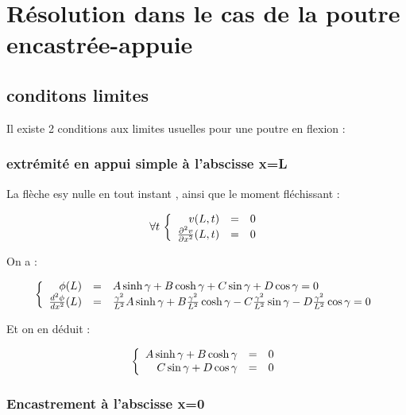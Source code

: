 \documentclass[a4paper,10pt]{report} %
\begin{document}
\chapter{Résolution dans le cas de la poutre encastrée-appuie} %


\section{conditons limites}

Il existe 2 conditions aux limites usuelles pour une poutre en flexion :

\subsection{extrémité en appui simple à l'abscisse x=L}

La flèche esy nulle en tout instant , ainsi que le moment fléchissant :

\begin{equation}
    \forall t\, 
    \left\{
    \begin{array}{r c l}v(L,t)&=&0\\\frac{\partial ^2v}{\partial x^2}(L,t)&=&0
    \end{array}
    \right.
\end{equation}

On a :

\begin{equation}
    \left\{
    \begin{array}{r c l}
    \phi (L)&=&A\sinh{\gamma}+B\cosh{\gamma}+C\sin{\gamma}+D\cos{\gamma}=0\\
    \frac{d^2\phi}{dx^2}(L)&=&\frac{\gamma^2}{L^2}A\sinh{\gamma}+B\frac{\gamma^2}{L^2}\cosh{\gamma}-C\frac{\gamma^2}{L^2}\sin{\gamma}-D\frac{\gamma^2}{L^2}\cos{\gamma}=0
    \end{array}
    \right.
\end{equation}

Et on en déduit :

\begin{equation}
    \left \{
    \begin{array}{r c l}
    A\sinh{\gamma}+B\cosh{\gamma}&=&0\\
    C\sin{\gamma}+D\cos{\gamma}&=&0
    \end{array}
    \right.
\end{equation}

\subsection{Encastrement à l'abscisse x=0}
\end{document}
